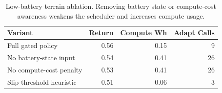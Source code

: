 \begin{table}[t]
\centering
\caption{Low-battery terrain ablation. Removing battery state or compute-cost awareness weakens the scheduler and increases compute usage.}
\label{tab:ablation}
\small
\begin{tabular}{lrrr}
\toprule
Variant & Return & Compute Wh & Adapt Calls \\
\midrule
Full gated policy & 0.56 & 0.15 & 9 \\
No battery-state input & 0.54 & 0.41 & 26 \\
No compute-cost penalty & 0.53 & 0.41 & 26 \\
Slip-threshold heuristic & 0.51 & 0.06 & 3 \\
\bottomrule
\end{tabular}
\end{table}
